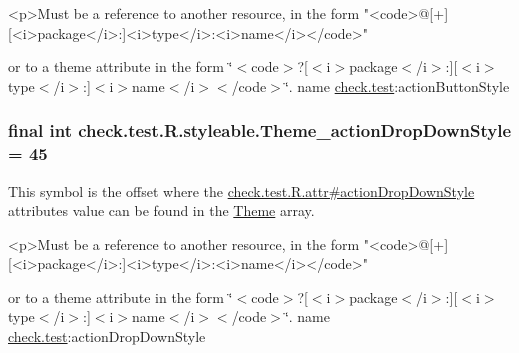 \begin{DoxyVerb}      <p>Must be a reference to another resource, in the form "<code>@[+][<i>package</i>:]<i>type</i>:<i>name</i></code>"
\end{DoxyVerb}
 or to a theme attribute in the form \char`\"{}$<$code$>$?\mbox{[}$<$i$>$package$<$/i$>$\+:\mbox{]}\mbox{[}$<$i$>$type$<$/i$>$\+:\mbox{]}$<$i$>$name$<$/i$>$$<$/code$>$\char`\"{}.  name \hyperlink{namespacecheck_1_1test}{check.\+test}\+:action\+Button\+Style \hypertarget{classcheck_1_1test_1_1_r_1_1styleable_a1701f361e9f3c65f693656182107e83b}{}
\subsubsection[{Theme\+\_\+action\+Drop\+Down\+Style}]{\setlength{\rightskip}{0pt plus 5cm}final int check.\+test.\+R.\+styleable.\+Theme\+\_\+action\+Drop\+Down\+Style = 45\hspace{0.3cm}{\ttfamily [static]}}\label{classcheck_1_1test_1_1_r_1_1styleable_a1701f361e9f3c65f693656182107e83b}
This symbol is the offset where the \hyperlink{classcheck_1_1test_1_1_r_1_1attr_a45269834542ea70d42dc68393312c539}{check.\+test.\+R.\+attr\#action\+Drop\+Down\+Style} attribute\textquotesingle{}s value can be found in the \hyperlink{classcheck_1_1test_1_1_r_1_1styleable_acca726d02016a0cf607782ec3a436a81}{Theme} array.

\begin{DoxyVerb}      <p>Must be a reference to another resource, in the form "<code>@[+][<i>package</i>:]<i>type</i>:<i>name</i></code>"
\end{DoxyVerb}
 or to a theme attribute in the form \char`\"{}$<$code$>$?\mbox{[}$<$i$>$package$<$/i$>$\+:\mbox{]}\mbox{[}$<$i$>$type$<$/i$>$\+:\mbox{]}$<$i$>$name$<$/i$>$$<$/code$>$\char`\"{}.  name \hyperlink{namespacecheck_1_1test}{check.\+test}\+:action\+Drop\+Down\+Style \hypertarget{classcheck_1_1test_1_1_r_1_1styleable_af897628603939c74ea86e5ec3ba329a4}{}
